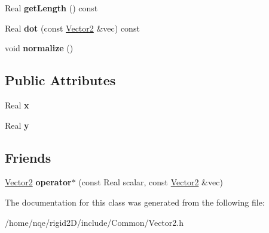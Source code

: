 \begin{DoxyCompactItemize}
\item 
\hypertarget{class_rigid2_d_1_1_vector2_ae9f9188eb2c554abfa117bbe26e0077d}{
Real {\bfseries getLength} () const }
\label{class_rigid2_d_1_1_vector2_ae9f9188eb2c554abfa117bbe26e0077d}

\item 
\hypertarget{class_rigid2_d_1_1_vector2_a2ea7dc545c2cb31cac5357c71a2cb21d}{
Real {\bfseries dot} (const \hyperlink{class_rigid2_d_1_1_vector2}{Vector2} \&vec) const }
\label{class_rigid2_d_1_1_vector2_a2ea7dc545c2cb31cac5357c71a2cb21d}

\item 
\hypertarget{class_rigid2_d_1_1_vector2_a768c74050416de0cac3dcc19c9c011b7}{
void {\bfseries normalize} ()}
\label{class_rigid2_d_1_1_vector2_a768c74050416de0cac3dcc19c9c011b7}

\end{DoxyCompactItemize}
\subsection*{Public Attributes}
\begin{DoxyCompactItemize}
\item 
\hypertarget{class_rigid2_d_1_1_vector2_a6eb7a52f0667e84ea67714b3fecf7990}{
Real {\bfseries x}}
\label{class_rigid2_d_1_1_vector2_a6eb7a52f0667e84ea67714b3fecf7990}

\item 
\hypertarget{class_rigid2_d_1_1_vector2_a88e7a297f650223d8f0f28e1b2fe9011}{
Real {\bfseries y}}
\label{class_rigid2_d_1_1_vector2_a88e7a297f650223d8f0f28e1b2fe9011}

\end{DoxyCompactItemize}
\subsection*{Friends}
\begin{DoxyCompactItemize}
\item 
\hypertarget{class_rigid2_d_1_1_vector2_a2b3772706514c1a813b33a6fb2149104}{
\hyperlink{class_rigid2_d_1_1_vector2}{Vector2} {\bfseries operator$\ast$} (const Real scalar, const \hyperlink{class_rigid2_d_1_1_vector2}{Vector2} \&vec)}
\label{class_rigid2_d_1_1_vector2_a2b3772706514c1a813b33a6fb2149104}

\end{DoxyCompactItemize}


The documentation for this class was generated from the following file:\begin{DoxyCompactItemize}
\item 
/home/nqe/rigid2D/include/Common/Vector2.h\end{DoxyCompactItemize}
